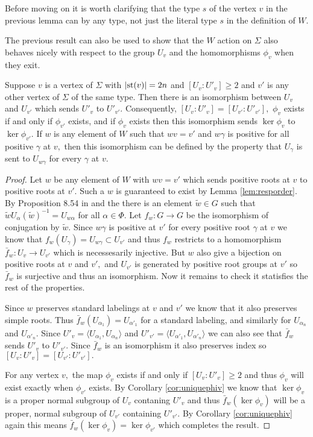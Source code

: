 \documentclass[class=book, crop=false,12 pt]{standalone}
\begin{document}
Before moving on it is worth clarifying that the type $s$ of the vertex $v$ in the previous lemma can by any type, not just the literal type $s$ in the definition of $W.$

The previous result can also be used to show that the $W$ action on $\Sigma$ also behaves nicely with respect to the group $U_v$ and the homomorphisms $\phi_v$ when they exit.
\begin{cor}
	\label{cor:respectphiv}
	Suppose $v$ is a vertex of $\Sigma$ with $|\mathrm{st}(v)|=2n$ and $[U_v:U'_v]\ge 2$ and $v'$ is any other vertex of $\Sigma$ of the same type. Then there is an isomorphism between $U_v$ and $U_{v'}$ which sends $U'_v$ to $U'_{v'}.$ Consequently, $[U_v:U'_v]=[U_{v'}:U'_{v'}],$ $\phi_v$ exists if and only if $\phi_{v'}$ exists, and if $\phi_v$ exists then this isomorphism sends $\ker \phi_v$ to $\ker \phi_{v'}.$ If $w$ is any element of $W$ such that $wv=v'$ and $w\gamma$ is positive for all positive $\gamma$ at $v,$ then this isomorphism can be defined by the property that $U_\gamma$ is sent to $U_{w\gamma}$ for every $\gamma$ at $v.$
\end{cor}
\begin{proof}
	Let $w$ be any element of $W$ with $wv=v'$ which sends positive roots at $v$ to positive roots at $v'.$ Such a $w$ is guaranteed to exist by Lemma \ref{lem:resporder}. By Proposition 8.54 in \cite{buildings} and the there is an element $\tilde{w}\in G$ such that $\tilde{w}U_\alpha (\tilde{w})^{-1}=U_{w\alpha}$ for all $\alpha\in \Phi.$ Let $f_w:G\to G$ be the isomorphism of conjugation by $\tilde{w}.$ Since $w\gamma$ is positive at $v'$ for every positive root $\gamma$ at $v$ we know that $f_w(U_\gamma)=U_{w\gamma}\subset U_{v'}$ and thus $f_w$ restricts to a homomorphism $\bar{f}_w:U_v\to U_{v'}$ which is necessesarily injective. But $w$ also give a bijection on positive roots at $v$ and $v',$ and $U_{v'}$ is generated by positive root groups at $v'$ so $\bar{f}_w$ is surjective and thus an isomorphism. Now it remains to check it statisfies the rest of the properties. 

	Since $w$ preserves standard labelings at $v$ and $v'$ we know that it also preserves simple roots. Thus $\bar{f}_w(U_{\alpha_1})=U_{\alpha'_1}$ for a standard labeling, and similarly for $U_{\alpha_n}$ and $U_{\alpha'_n}.$ Since $U'_v=\langle U_{\alpha_1},U_{\alpha_n}\rangle$ and $U'_{v'}=\langle U_{\alpha'_1},U_{\alpha'_n}\rangle$ we can also see that $\bar{f}_w$ sends $U'_v$ to $U'_{v'}.$ Since $\bar{f}_w$ is an isomorphism it also preserves index so $[U_v:U'_v]=[U_{v'}:U'_{v'}].$

	For any vertex $v,$ the map $\phi_v$ exists if and only if $[U_v:U'_v]\ge 2$ and thus $\phi_v$ will exist exactly when $\phi_{v'}$ exists. By Corollary \ref{cor:uniquephiv} we know that $\ker \phi_v$ is a proper normal subgroup of $U_v$ contaning $U'_v$ and thus $\bar{f}_w(\ker \phi_v)$ will be a proper, normal subgroup of $U_{v'}$ containing $U'_{v'}.$ By Corollary \ref{cor:uniquephiv} again this means $\bar{f}_w(\ker \phi_v)=\ker \phi_{v'}$ which completes the result.
\end{proof}
\end{document}
